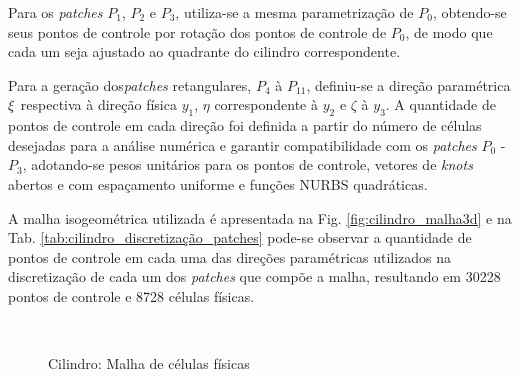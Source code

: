 \documentclass[tese_patricia]{subfiles}
\begin{document}
Para os \textit{patches} $P_1$, $P_2$ e $P_3$, utiliza-se a mesma parametrização de $P_0$, obtendo-se seus pontos de controle por rotação dos pontos de controle de $P_0$, de modo que cada um seja ajustado ao quadrante do cilindro correspondente.

Para a geração dos\textit{patches} retangulares, $P_4$ à $P_{11}$, definiu-se a direção paramétrica $\xi$ respectiva à direção física $y_1$, $\eta$ correspondente à $y_2$ e $\zeta$ à $y_3$. A quantidade de pontos de controle em cada direção foi definida a partir do número de células desejadas para a análise numérica e garantir compatibilidade com os \textit{patches} $P_0$ - $P_3$, adotando-se pesos unitários para os pontos de controle, vetores de \textit{knots} abertos e com espaçamento uniforme e funções NURBS quadráticas. 

A malha isogeométrica utilizada é apresentada na Fig. \ref{fig:cilindro_malha3d} e na Tab. \ref{tab:cilindro_discretização_patches} pode-se observar a quantidade de pontos de controle em cada uma das direções paramétricas utilizados na discretização de cada um dos \textit{patches} que compõe a malha, resultando em 30228 pontos de controle e 8728 células físicas.


\begin{figure}[!htb]
	\centering
	\\
	\caption{Cilindro: Malha de células físicas}
\end{figure}
\end{document}
